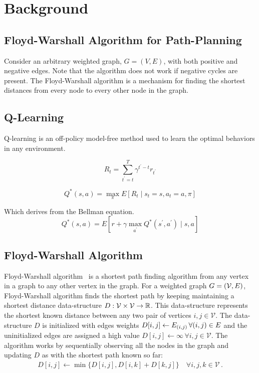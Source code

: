 \section{Background}

\subsection{Floyd-Warshall Algorithm for Path-Planning}

Consider an arbitrary weighted graph, $G = (V, E)$, with both positive and
negative edges. Note that the algorithm does not work if negative cycles
are present. The Floyd-Warshall algorithm is a mechanism for finding the
shortest distances from every node to every other node in the graph. 


\subsection{Q-Learning}
Q-learning is an off-policy model-free method used to learn the optimal
behaviors in any environment. 

\begin{equation}
    R_t = \sum_{t^{'}=t}^{T} \gamma^{t^{'}-t} r_{t^{'}}
\end{equation}

\begin{equation}
    Q^*(s, a) = \max_{\pi} E[R_t \mid s_t=s, a_t=a, \pi]
\end{equation}


\noindent
Which derives from the Bellman equation.
\begin{equation}
    Q^*(s, a) = E[r + \gamma \max_{a^{'}} Q^*(s^{'}, a^{'}) \mid s, a]
\end{equation}

\subsection{Floyd-Warshall Algorithm}
\newcommand{\vertices}{\mathcal{V}}
\newcommand{\wts}{W}
\newcommand{\fwds}{D}

Floyd-Warshall algorithm~\citep{floydwarshall1962} is a shortest path finding
algorithm from any vertex in a graph to any other vertex in the graph.
For a weighted graph $G = (\vertices, \edges)$, Floyd-Warshall algorithm
finds the shortest path by keeping maintaining a shortest distance
data-structure $\fwds : \vertices \times \vertices \rightarrow \R$.
This data-structure represents the shortest known distance between any
two pair of vertices $i, j \in \vertices$.
The data-structure $\fwds$ is initialized with edges weights
$\fwds[i, j] \leftarrow \edges_{(i, j)} \, \forall (i, j) \in \edges$
and the uninitialized edges are assigned a high value
$\fwds[i, j] \leftarrow \infty \, \forall i, j \in \vertices$.
The algorithm works by sequentially observing all the nodes in the graph and
updating $\fwds$ as with the shortest path known so far:
%
\begin{align}
  \fwds[i, j] \leftarrow \min\{ \fwds[i, j], \fwds[i, k] + \fwds[k, j] \} \quad
  \forall i, j, k \in \vertices \, .
\end{align}%
%

